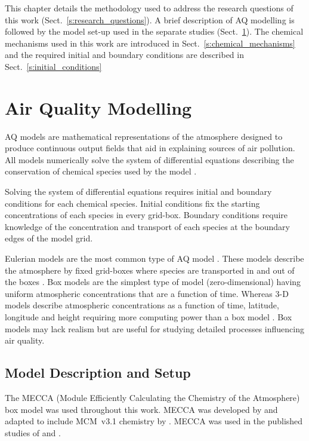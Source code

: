 This chapter details the methodology used to address the research questions of this work (Sect.~\ref{s:research_questions}).
A brief description of AQ modelling is followed by the model set-up used in the separate studies (Sect.~\ref{s:modelling}). 
The chemical mechanisms used in this work are introduced in Sect.~\ref{s:chemical_mechanisms} and the required initial and boundary conditions are described in Sect.~\ref{s:initial_conditions} 

\section{Air Quality Modelling} \label{s:modelling}
AQ models are mathematical representations of the atmosphere designed to produce continuous output fields that aid in explaining sources of air pollution.
All models numerically solve the system of differential equations describing the conservation of chemical species used by the model \citep{Russell:2000}.

Solving the system of differential equations requires initial and boundary conditions for each chemical species.
Initial conditions fix the starting concentrations of each species in every grid-box.
Boundary conditions require knowledge of the concentration and transport of each species at the boundary edges of the model grid.

\vbox{%
Eulerian models are the most common type of AQ model \citep{Russell:2000}.
These models describe the atmosphere by fixed grid-boxes where species are transported in and out of the boxes \citep{Seinfeld:2006}. 
Box models are the simplest type of model (zero-dimensional) having uniform atmospheric concentrations that are a function of time.
Whereas 3-D models describe atmospheric concentrations as a function of time, latitude, longitude and height requiring more computing power than a box model \citep{Seinfeld:2006}.
Box models may lack realism but are useful for studying detailed processes influencing air quality.
}

\subsection{Model Description and Setup} \label{ss:model_setup}
The MECCA (Module Efficiently Calculating the Chemistry of the Atmosphere) box model was used throughout this work.
MECCA was developed by \citet{Sander:2005} and adapted to include MCM~v3.1 chemistry by \citet{Butler:2011}.
MECCA was used in the published studies of \citet{Kubistin:2010} and \citet{Lourens:2016}.

